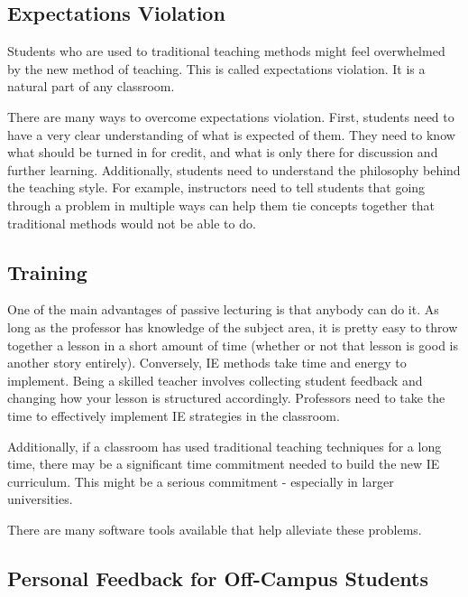 %
\subsection{Expectations Violation}

Students who are used to traditional teaching methods might feel overwhelmed by the new method of teaching. This is called expectations violation. It is a natural part of any classroom.

There are many ways to overcome expectations violation. First, students need to have a very clear understanding of what is expected of them. They need to know what should be turned in for credit, and what is only there for discussion and further learning. Additionally, students need to understand the philosophy behind the teaching style. For example, instructors need to tell students that going through a problem in multiple ways can help them tie concepts together that traditional methods would not be able to do.

\subsection{Training}

One of the main advantages of passive lecturing is that anybody can do it. As long as the professor has knowledge of the subject area, it is pretty easy to throw together a lesson in a short amount of time (whether or not that lesson is good is another story entirely). Conversely, IE methods take time and energy to implement. Being a skilled teacher involves collecting student feedback and changing how your lesson is structured accordingly. Professors need to take the time to effectively implement IE strategies in the classroom.

Additionally, if a classroom has used traditional teaching techniques for a long time, there may be a significant time commitment needed to build the new IE curriculum. This might be a serious commitment - especially in larger universities.

There are many software tools available that help alleviate these problems.

\subsection{Personal Feedback for Off-Campus Students}

